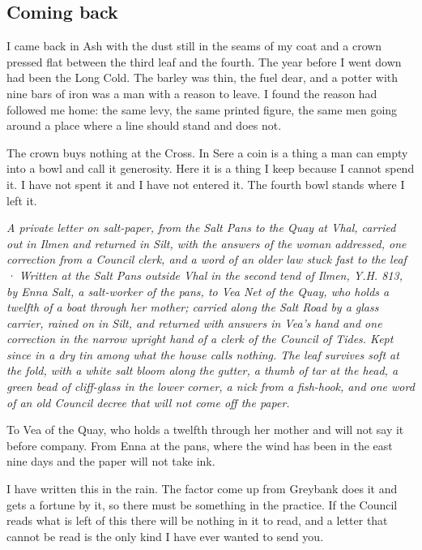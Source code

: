 \documentclass{design/chronicle}
\begin{document}
\subsection*{Coming back}

I came back in Ash with the dust still in the seams of my coat and a crown pressed flat between the third leaf and the fourth. The year before I went down had been the Long Cold. The barley was thin, the fuel dear, and a potter with nine bars of iron was a man with a reason to leave. I found the reason had followed me home: the same levy, the same printed figure, the same men going around a place where a line should stand and does not.

The crown buys nothing at the Cross. In Sere a coin is a thing a man can empty into a bowl and call it generosity. Here it is a thing I keep because I cannot spend it. I have not spent it and I have not entered it. The fourth bowl stands where I left it.

\clearpage{}
{\centering\FellFont\itshape\footnotesize\color{faded} A private letter on salt-paper, from the Salt Pans to the Quay at Vhal, carried out in Ilmen and returned in Silt, with the answers of the woman addressed, one correction from a Council clerk, and a word of an older law stuck fast to the leaf · Written at the Salt Pans outside Vhal in the second tend of Ilmen, Y.H. 813, by Enna Salt, a salt-worker of the pans, to Vea Net of the Quay, who holds a twelfth of a boat through her mother; carried along the Salt Road by a glass carrier, rained on in Silt, and returned with answers in Vea’s hand and one correction in the narrow upright hand of a clerk of the Council of Tides. Kept since in a dry tin among what the house calls nothing. The leaf survives soft at the fold, with a white salt bloom along the gutter, a thumb of tar at the head, a green bead of cliff-glass in the lower corner, a nick from a fish-hook, and one word of an old Council decree that will not come off the paper.\par}\medskip
To Vea of the Quay, who holds a twelfth through her mother and will not say it before company. From Enna at the pans, where the wind has been in the east nine days and the paper will not take ink.

I have written this in the rain. The factor come up from Greybank does it and gets a fortune by it, so there must be something in the practice. If the Council reads what is left of this there will be nothing in it to read, and a letter that cannot be read is the only kind I have ever wanted to send you.
\end{document}
